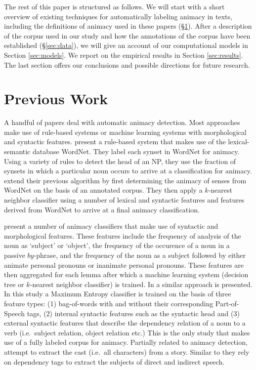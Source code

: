 \documentclass[a4paper,UKenglish]{oasics}
\begin{document}
The rest of this paper is structured as follows. We will start with a
short overview of existing techniques for automatically labeling
animacy in texts, including the definitions of animacy used in these
papers (\S\ref{sec:previous-work}). After a description of the corpus
used in our study and how the annotations of the corpus have been
established (\S\ref{sec:data}), we will give an account of our
computational models in Section \ref{sec:models}. We report on the
empirical results in Section \ref{sec:results}. The last section
offers our conclusions and possible directions for future research.


\section{Previous Work}\label{sec:previous-work}

A handful of papers deal with automatic animacy detection. Most
approaches make use of rule-based systems or machine learning systems
with morphological and syntactic features. \cite{evans:00} present a
rule-based system that makes use of the lexical-semantic database
WordNet. They label each synset in WordNet for animacy. Using a
variety of rules to detect the head of an NP, they use the fraction of
synsets in which a particular noun occurs to arrive at a
classification for animacy. \cite{orasan:01} extend their previous
algorithm by first determining the animacy of senses from WordNet on
the basis of an annotated corpus. They then apply a $k$-nearest
neighbor classifier using a number of lexical and syntactic features
and features derived from WordNet to arrive at a final animacy
classification.

\cite{ovrelid:04,ovrelid:05,ovrelid:06,ovrelid:08,ovrelid:09} present
a number of animacy classifiers that make use of syntactic and
morphological features. These features include the frequency of
analysis of the noun as `subject' or `object', the frequency of the
occurence of a noun in a passive $by$-phrase, and the frequency of the
noun as a subject followed by either animate personal pronouns or
inanimate personal pronouns. These features are then aggregated for
each lemma after which a machine learning system (decision tree or
$k$-nearest neighbor classifier) is trained. In \cite{bowman:12} a
similar approach is presented. In this study a Maximum Entropy
classifier is trained on the basis of three feature types: (1)
bag-of-words with and without their corresponding Part-of-Speech tags,
(2) internal syntactic features such as the syntactic head and (3)
external syntactic features that describe the dependency relation of a
noun to a verb (i.e.\ subject relation, object relation etc.)  This is
the only study that makes use of a fully labeled corpus for animacy.
Partially related to animacy detection, \cite{karsdorp:12}
attempt to extract the cast (i.e.\ all characters) from a
story. Similar to \cite{bowman:12} they rely on dependency tags to
extract the subjects of direct and indirect speech.
\end{document}
